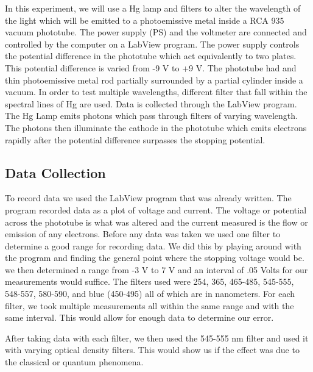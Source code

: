 \documentclass[11pt,letterpaper,onecolumn]{article}
\begin{document}
In this experiment, we will use a Hg lamp and filters to alter the wavelength of the light which will be emitted to a photoemissive metal inside a RCA 935 vacuum phototube. The power supply (PS) and the voltmeter are connected and controlled by the computer on a LabView program. The power supply controls the potential difference in the phototube which act equivalently to two plates. This potential difference is varied from -9 V to +9 V. The phototube had and thin photoemissive metal rod partially surrounded by a partial cylinder inside a vacuum. In order to test multiple wavelengths, different filter that fall within the spectral lines of Hg are used. Data is collected through the LabView program. The Hg Lamp emits photons which pass through filters of varying wavelength. The photons then illuminate the cathode in the phototube which emits electrons rapidly after the potential difference surpasses the stopping potential. 

\subsection{Data Collection}

 To record data we used the LabView program that was already written. The program recorded data as a plot of voltage and current. The voltage or potential across the phototube is what was altered and the current measured is the flow or emission of any electrons. Before any data was taken we used one filter to determine a good range for recording data. We did this by playing around with the program and finding the general point where the stopping voltage would be. we then determined a range from -3 V to 7 V and an interval of .05 Volts for our measurements would suffice. The filters used were 254, 365, 465-485, 545-555, 548-557, 580-590, and blue (450-495) all of which are in nanometers. For each filter, we took multiple measurements all within the same range and with the same interval. This would allow for enough data to determine our error.
 
 After taking data with each filter, we then used the 545-555 nm filter and used it with varying optical density filters. This would show us if the effect was due to the classical or quantum phenomena. 
 
\end{document}
